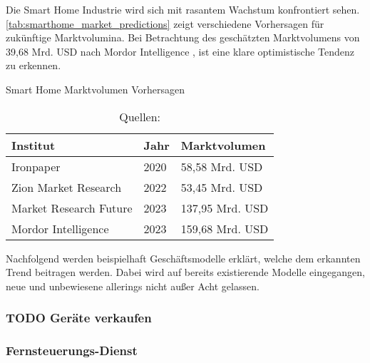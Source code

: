 Die Smart Home Industrie wird sich mit rasantem Wachstum konfrontiert sehen.
\autoref{tab:smarthome_market_predictions} zeigt verschiedene Vorhersagen für zukünftige Marktvolumina.
Bei Betrachtung des geschätzten Marktvolumens von 39,68 Mrd. USD nach Mordor Intelligence , ist eine klare optimistische Tendenz zu erkennen.

\begin{table}[ht]
	\caption{Smart Home Marktvolumen Vorhersagen}
	\centering
	\begin{tabular}{| p{} | p{} | p{} |}
		\hline
		\textbf{Institut} 	& \textbf{Jahr} & \textbf{Marktvolumen} \\ \hline
		Ironpaper & 2020 & 58,58 Mrd. USD \\ \hline
		Zion Market Research & 2022 & 53,45 Mrd. USD \\ \hline
		Market Research Future & 2023 & 137,95 Mrd. USD \\ \hline
		Mordor Intelligence & 2023 & 159,68 Mrd. USD \\ \hline
	\end{tabular}
	\caption*{\footnotesize{Quellen: }}
	\label{tab:smarthome_market_predictions}
\end{table}

Nachfolgend werden beispielhaft Geschäftsmodelle erklärt, welche dem erkannten Trend beitragen werden.
Dabei wird auf bereits existierende Modelle eingegangen, neue und unbewiesene allerings nicht außer Acht gelassen.


\subsubsection{\textbf{TODO} Geräte verkaufen} %


\subsubsection{Fernsteuerungs-Dienst} %


